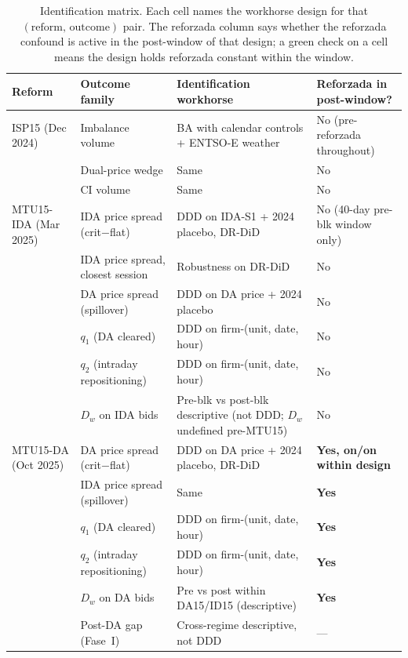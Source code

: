 \documentclass[11pt,a4paper]{article}
\begin{document}
\begin{table}[H]
\centering\scriptsize
\setlength{\tabcolsep}{4pt}
\caption{Identification matrix. Each cell names the workhorse design for that $(\text{reform},\,\text{outcome})$ pair. The reforzada column says whether the reforzada confound is active in the post-window of that design; a green check on a cell means the design holds reforzada constant within the window.}
\label{tab:ident_matrix}
\begin{tabular}{@{}l l l l@{}}
\toprule
Reform & Outcome family & Identification workhorse & Reforzada in post-window? \\
\midrule
ISP15 (Dec 2024) & Imbalance volume & BA with calendar controls + ENTSO-E weather & No (pre-reforzada throughout) \\
                 & Dual-price wedge & Same                                          & No \\
                 & CI volume        & Same                                          & No \\
\midrule
MTU15-IDA (Mar 2025) & IDA price spread (crit$-$flat) & DDD on IDA-S1 + 2024 placebo, DR-DiD & No (40-day pre-blk window only) \\
                     & IDA price spread, closest session & Robustness on DR-DiD                & No \\
                     & DA price spread (spillover)       & DDD on DA price + 2024 placebo      & No \\
                     & $q_1$ (DA cleared)                & DDD on firm-(unit, date, hour)      & No \\
                     & $q_2$ (intraday repositioning)    & DDD on firm-(unit, date, hour)      & No \\
                     & $D_w$ on IDA bids                 & Pre-blk vs post-blk descriptive (not DDD; $D_w$ undefined pre-MTU15) & No \\
\midrule
MTU15-DA (Oct 2025) & DA price spread (crit$-$flat) & DDD on DA price + 2024 placebo, DR-DiD & \textbf{Yes, on/on within design} \\
                    & IDA price spread (spillover)  & Same                                   & \textbf{Yes} \\
                    & $q_1$ (DA cleared)            & DDD on firm-(unit, date, hour)         & \textbf{Yes} \\
                    & $q_2$ (intraday repositioning)& DDD on firm-(unit, date, hour)         & \textbf{Yes} \\
                    & $D_w$ on DA bids              & Pre vs post within DA15/ID15 (descriptive) & \textbf{Yes} \\
                    & Post-DA gap (Fase~I)          & Cross-regime descriptive, not DDD      & --- \\
\bottomrule
\end{tabular}
\end{table}
\end{document}
